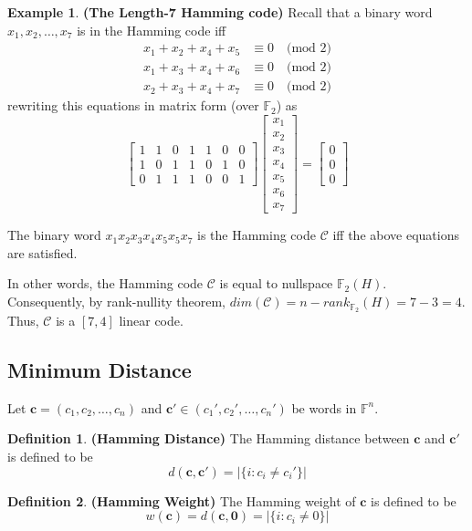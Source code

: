 \documentclass[12pt, oneside]{book}
\theoremstyle{definition}
\newtheorem{definition}{Definition}[section]
\theoremstyle{definition}
\newtheorem{example}{Example}[section]
\theoremstyle{remark}
\begin{document}
\begin{example}
    \textbf{(The Length-7 Hamming code)} Recall that a binary word $x_1,x_2,\ldots,x_7$ is in the Hamming code iff
    \begin{align*}
        x_1+x_2+x_4+x_5 &\equiv 0\quad \text{(mod 2)}\\
        x_1+x_3+x_4+x_6 &\equiv 0\quad \text{(mod 2)}\\
        x_2+x_3+x_4+x_7 &\equiv 0\quad \text{(mod 2)}
    \end{align*}
    rewriting this equations in matrix form (over $\mathbb{F}_2$) as
    \[
    \begin{bmatrix}
        1 &1 & 0 & 1 & 1 & 0 & 0 \\
        1 & 0 & 1 & 1 & 0 & 1 & 0 \\
        0 & 1 & 1 & 1 & 0 & 0 & 1
    \end{bmatrix}
    \begin{bmatrix}
        x_1 \\ x_2 \\ x_3 \\ x_4 \\ x_5 \\x_6 \\ x_7 
    \end{bmatrix}
    =\begin{bmatrix} 0 \\ 0 \\ 0 \end{bmatrix}
    \]
    
The binary word $x_1x_2x_3x_4x_5x_5x_7$ is the Hamming code $\mathcal{C}$ iff the above equations are satisfied.

In other words, the Hamming code $\mathcal{C}$ is equal to nullspace $\mathbb{F}_2(H)$. Consequently, by rank-nullity theorem, $dim(\mathcal{C})=n-rank_{\mathbb{F}_2}(H)=7-3=4$. Thus, $\mathcal{C}$ is a $[7,4]$ linear code.
\end{example}

\subsection{Minimum Distance}
Let $\mathbf{c}=(c_1,c_2,\ldots,c_n)$ and $\mathbf{c'}\in(c_1',c_2',\ldots,c_n')$ be words in $\mathbb{F}^n$. 
\begin{definition}
    \textbf{(Hamming Distance)} The Hamming distance between $\mathbf{c}$ and $\mathbf{c'}$ is defined to be
\[
d(\mathbf{c},\mathbf{c'})=|\{i:c_i\neq c_i'\}|
\]
\end{definition}
\begin{definition}
    \textbf{(Hamming Weight)} The Hamming weight of $\mathbf{c}$ is defined to be
\[
w(\mathbf{c})=d(\mathbf{c},\mathbf{0})=|\{i:c_i\neq 0\}|
\]
\end{definition}
\end{document}
